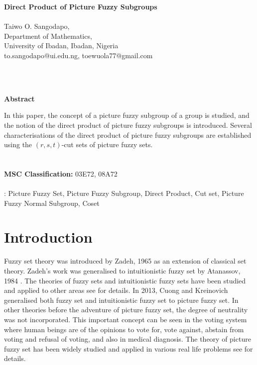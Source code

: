 \documentclass[12pt,letterpaper]{amsart}
\theoremstyle{plain}
\theoremstyle{definition}
\numberwithin{equation}{section}
\begin{document}
\begin{center}
{\textbf{{Direct Product of Picture Fuzzy Subgroups}}}\ \\ \ \\

{Taiwo O. Sangodapo},\\
Department of Mathematics,\\ University of Ibadan, Ibadan, Nigeria\\ to.sangodapo@ui.edu.ng,
toewuola77@gmail.com
\end{center}
\ \\ \  \\


\begin{center} {\textbf{Abstract}} \end{center}
In this paper, the concept of a picture fuzzy subgroup of a group is studied, and the notion of the direct product of picture fuzzy subgroups is introduced. Several characterisations of the direct product of picture fuzzy subgroups are established using the $(r, s, t)$-cut sets of picture fuzzy sets. 
\; \\ \; \\ \; \\


\noindent \textbf{MSC Classification:} 03E72, 08A72
\ \\ \ \\

: Picture Fuzzy Set, Picture Fuzzy Subgroup, Direct Product, Cut set, Picture Fuzzy Normal Subgroup, Coset

\section{Introduction}
Fuzzy set theory was introduced by Zadeh, 1965 \cite{z} as an extension of classical set theory. Zadeh's work was generalised to intuitionistic fuzzy set by Atanassov, 1984 \cite{a1}. The theories of fuzzy sets and intuitionistic fuzzy sets have been studied and applied to other areas see \cite{ta1, ta2, ta3} for details.  In 2013, Cuong and Kreinovich \cite{ck} generalised both fuzzy set and intuitionistic fuzzy set to picture fuzzy set. In other theories before the adventure of picture fuzzy set, the degree of neutrality was not incorporated. This important concept can be seen in the voting system where human beings are of the opinions to vote for, vote against, abstain from voting and refusal of voting, and also in medical diagnosis. The theory of picture fuzzy set has been widely studied and applied in various real life problems see \cite{c4, ch, ckn, dg, to, t1, t2, t3, t4, s1, s2} for details.
\end{document}
